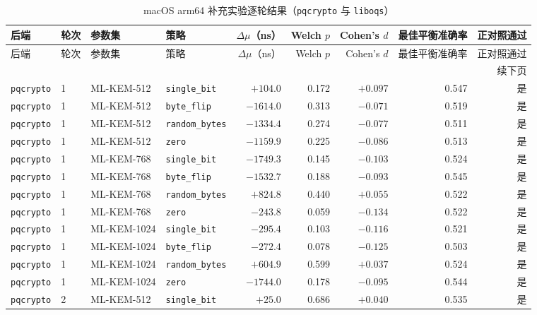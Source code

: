 \documentclass[a4paper,fontset=none]{ctexart}
\begin{document}
{\scriptsize
\setlength{\tabcolsep}{2.5pt}
\begin{longtable}[c]{lllp{2.1cm}rrrrr}
  \caption{macOS arm64 补充实验逐轮结果（\texttt{pqcrypto} 与 \texttt{liboqs}）}
  \label{tab:supp_runs}\\
  \toprule
  后端 & 轮次 & 参数集 & 策略 & $\Delta\mu$（ns） & Welch $p$ & Cohen's $d$ & 最佳平衡准确率 & 正对照通过 \\
  \midrule
  \endfirsthead
  \toprule
  后端 & 轮次 & 参数集 & 策略 & $\Delta\mu$（ns） & Welch $p$ & Cohen's $d$ & 最佳平衡准确率 & 正对照通过 \\
  \midrule
  \endhead
  \midrule
  \multicolumn{9}{r}{\small 续下页}\\
  \endfoot
  \bottomrule
  \endlastfoot
  \texttt{pqcrypto} & 1 & ML-KEM-512 & \texttt{single\_bit} & $+104.0$ & 0.172 & $+0.097$ & 0.547 & 是 \\
  \texttt{pqcrypto} & 1 & ML-KEM-512 & \texttt{byte\_flip} & $-1614.0$ & 0.313 & $-0.071$ & 0.519 & 是 \\
  \texttt{pqcrypto} & 1 & ML-KEM-512 & \texttt{random\_bytes} & $-1334.4$ & 0.274 & $-0.077$ & 0.511 & 是 \\
  \texttt{pqcrypto} & 1 & ML-KEM-512 & \texttt{zero} & $-1159.9$ & 0.225 & $-0.086$ & 0.513 & 是 \\
  \texttt{pqcrypto} & 1 & ML-KEM-768 & \texttt{single\_bit} & $-1749.3$ & 0.145 & $-0.103$ & 0.524 & 是 \\
  \texttt{pqcrypto} & 1 & ML-KEM-768 & \texttt{byte\_flip} & $-1532.7$ & 0.188 & $-0.093$ & 0.545 & 是 \\
  \texttt{pqcrypto} & 1 & ML-KEM-768 & \texttt{random\_bytes} & $+824.8$ & 0.440 & $+0.055$ & 0.522 & 是 \\
  \texttt{pqcrypto} & 1 & ML-KEM-768 & \texttt{zero} & $-243.8$ & 0.059 & $-0.134$ & 0.522 & 是 \\
  \texttt{pqcrypto} & 1 & ML-KEM-1024 & \texttt{single\_bit} & $-295.4$ & 0.103 & $-0.116$ & 0.521 & 是 \\
  \texttt{pqcrypto} & 1 & ML-KEM-1024 & \texttt{byte\_flip} & $-272.4$ & 0.078 & $-0.125$ & 0.503 & 是 \\
  \texttt{pqcrypto} & 1 & ML-KEM-1024 & \texttt{random\_bytes} & $+604.9$ & 0.599 & $+0.037$ & 0.524 & 是 \\
  \texttt{pqcrypto} & 1 & ML-KEM-1024 & \texttt{zero} & $-1744.0$ & 0.178 & $-0.095$ & 0.544 & 是 \\
  \texttt{pqcrypto} & 2 & ML-KEM-512 & \texttt{single\_bit} & $+25.0$ & 0.686 & $+0.040$ & 0.535 & 是 \\

\end{longtable}}
\end{document}
